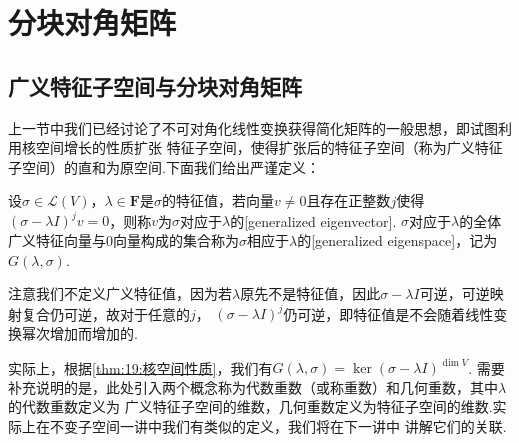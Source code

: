 \section{分块对角矩阵}
\subsection{广义特征子空间与分块对角矩阵}
上一节中我们已经讨论了不可对角化线性变换获得简化矩阵的一般思想，即试图利用核空间增长的性质扩张
特征子空间，使得扩张后的特征子空间（称为广义特征子空间）的直和为原空间.下面我们给出严谨定义：
\begin{definition}
    设$\sigma\in \mathcal{L}(V)$，$\lambda\in\mathbf{F}$是$\sigma$的特征值，若向量$v\neq 0$且存在正整数$j$使得
    $(\sigma-\lambda I)^jv=0$，则称$v$为$\sigma$对应于$\lambda$的[generalized eigenvector].
    $\sigma$对应于$\lambda$的全体广义特征向量与0向量构成的集合称为$\sigma$相应于$\lambda$的[generalized eigenspace]，记为$G(\lambda,\sigma)$.
\end{definition}
注意我们不定义广义特征值，因为若$\lambda$原先不是特征值，因此$\sigma-\lambda I$可逆，可逆映射复合仍可逆，故对于任意的$j$，
$(\sigma-\lambda I)^j$仍可逆，即特征值是不会随着线性变换幂次增加而增加的.

实际上，根据\autoref{thm:19:核空间性质}，我们有$G(\lambda,\sigma)=\ker (\sigma-\lambda I)^{\dim V}$.
需要补充说明的是，此处引入两个概念称为代数重数（或称重数）和几何重数，其中$\lambda$的代数重数定义为
广义特征子空间的维数，几何重数定义为特征子空间的维数.实际上在不变子空间一讲中我们有类似的定义，我们将在下一讲中
讲解它们的关联.

